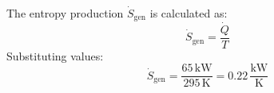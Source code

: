 The entropy production \( \dot{S}_{\text{gen}} \) is calculated as:  
\[
\dot{S}_{\text{gen}} = \frac{\dot{Q}}{T}
\]  
Substituting values:  
\[
\dot{S}_{\text{gen}} = \frac{65 \, \text{kW}}{295 \, \text{K}} = 0.22 \, \frac{\text{kW}}{\text{K}}
\]